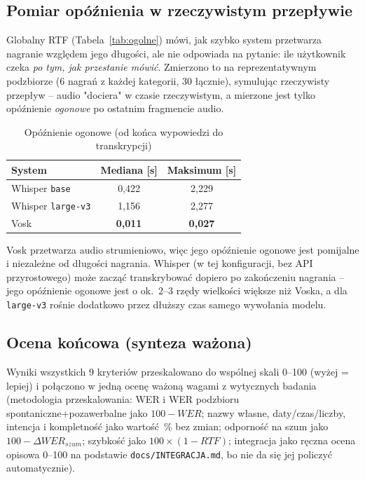 \documentclass{article}
\begin{document}
\subsection{Pomiar opóźnienia w rzeczywistym przepływie}
\label{sec:latency}

Globalny RTF (Tabela~\ref{tab:ogolne}) mówi, jak szybko system przetwarza
nagranie względem jego długości, ale nie odpowiada na pytanie: ile
użytkownik czeka \emph{po tym, jak przestanie mówić}. Zmierzono to na
reprezentatywnym podzbiorze (6 nagrań z każdej kategorii, 30 łącznie),
symulując rzeczywisty przepływ -- audio "dociera" w czasie rzeczywistym, a
mierzone jest tylko opóźnienie \emph{ogonowe} po ostatnim fragmencie audio.

\begin{table}[htbp]
\centering
\caption{Opóźnienie ogonowe (od końca wypowiedzi do transkrypcji)}
\label{tab:latency}
\begin{tabular}{lcc}
\toprule
\textbf{System} & \textbf{Mediana [s]} & \textbf{Maksimum [s]} \\
\midrule
Whisper \texttt{base}     & 0,422 & 2,229 \\
Whisper \texttt{large-v3} & 1,156 & 2,277 \\
Vosk                     & \textbf{0,011} & \textbf{0,027} \\
\bottomrule
\end{tabular}
\end{table}

Vosk przetwarza audio strumieniowo, więc jego opóźnienie ogonowe jest
pomijalne i niezależne od długości nagrania. Whisper (w tej konfiguracji,
bez API przyrostowego) może zacząć transkrybować dopiero po zakończeniu
nagrania -- jego opóźnienie ogonowe jest o ok.~2--3 rzędy wielkości większe
niż Voska, a dla \texttt{large-v3} rośnie dodatkowo przez dłuższy czas
samego wywołania modelu.

\subsection{Ocena końcowa (synteza ważona)}

Wyniki wszystkich 9 kryteriów przeskalowano do wspólnej skali 0--100 (wyżej
= lepiej) i połączono w jedną ocenę ważoną wagami z wytycznych badania
(metodologia przeskalowania: WER i WER podzbioru spontaniczne+pozawerbalne
jako $100-WER$; nazwy własne, daty/czas/liczby, intencja i kompletność jako
wartość~\% bez zmian; odporność na szum jako $100-\Delta WER_{szum}$;
szybkość jako $100 \times (1-RTF)$; integracja jako ręczna ocena opisowa
0--100 na podstawie \texttt{docs/INTEGRACJA.md}, bo nie da się jej policzyć
automatycznie).
\end{document}
